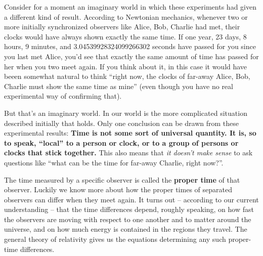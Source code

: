 \documentclass[a4paper,12pt,%
onecolumn,oneside,titlepage,%
british%
]{memoir}
\renewcommand*{\|}[1][]{\nonscript\:#1\vert\nonscript\:\mathopen{}}
\begin{document}
Consider for a moment an imaginary world in which these experiments had given a different kind of result. According to Newtonian mechanics, whenever two or more initially synchronized observers like Alice, Bob, Charlie had met, their clocks would have always shown exactly the same time. If one year, 23 days, 8 hours, 9 minutes, and \num{3.04539928324099266302} seconds have passed for you since you last met Alice, you'd see that exactly the same amount of time has passed for her when you two meet again. If you think about it, in this case it would have beeen somewhat natural to think \enquote{right now, the clocks of far-away Alice, Bob, Charlie must show the same time as mine} (even though you have no real experimental way of confirming that).

But that's an imaginary world. In our world is the more complicated situation described initially that holds. Only one conclusion can be drawn from these experimental results: \textbf{Time is not some sort of universal quantity. It is, so to speak, \enquote{local} to a person or clock, or to a group of persons or clocks that stick together.} This also means that \emph{it doesn't make sense} to ask questions like \enquote{what can be the time for far-away Charlie, right now?}. %


The time measured by a specific observer is called the \textbf{proper time} of that observer. Luckily we know more about how the proper times of separated observers can differ when they meet again. It turns out -- according to our current understanding -- that the time differences depend, roughly speaking, on how fast the observers are moving with respect to one another and to matter around the universe, and on how much energy is contained in the regions they travel. The general theory of relativity gives us the equations determining any such proper-time differences.
\end{document}
